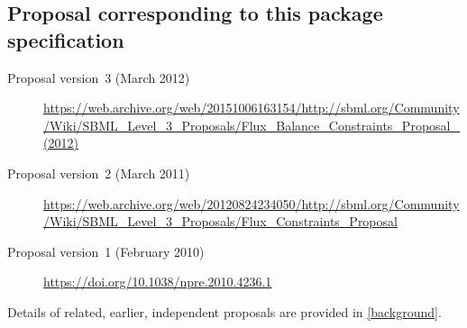 \subsection{Proposal corresponding to this package specification}

%
\begin{description}
  \item[Proposal version~3 (March 2012)]
  \item [] {\small\url{https://web.archive.org/web/20151006163154/http://sbml.org/Community/Wiki/SBML_Level_3_Proposals/Flux_Balance_Constraints_Proposal_(2012)}}
  \item[Proposal version~2 (March 2011)]
  \item [] {\small\url{https://web.archive.org/web/20120824234050/http://sbml.org/Community/Wiki/SBML_Level_3_Proposals/Flux_Constraints_Proposal}}
  \item[Proposal version~1 (February 2010)]
  \item [] {\small\url{https://doi.org/10.1038/npre.2010.4236.1}}
\end{description}
%
Details of related, earlier, independent proposals are provided in \ref{background}.



